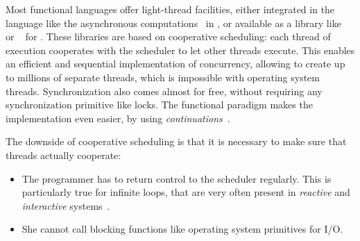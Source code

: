 \documentclass[9pt]{sigplanconf}
\begin{document}

Most functional languages offer light-thread facilities, either integrated in the language like the asynchronous computations~\cite{Syme:2011} in \fsharp, or available as a library like \conhaskell~\cite{Jones:1996} or \lwt~\cite{Vouillon:2008} for \ocaml. These libraries are based on cooperative scheduling: each thread of execution cooperates with the scheduler to let other threads execute. This enables an efficient and sequential implementation of concurrency, allowing to create up to millions of separate threads, which is impossible with operating system threads. Synchronization also comes almost for free, without requiring any synchronization primitive like locks. The functional paradigm makes the implementation even easier, by using \emph{continuations}~\cite{Claessen:1999}.

The downside of cooperative scheduling is that it is necessary to make sure that threads actually cooperate:
\begin{itemize}
\item The programmer has to return control to the scheduler regularly. This is particularly true for infinite loops, that are very often present in \emph{reactive} and \emph{interactive} systems~\cite{Harel:1985}. 
\item She cannot call blocking functions like operating system primitives for I/O. 
\end{itemize}
\end{document}
